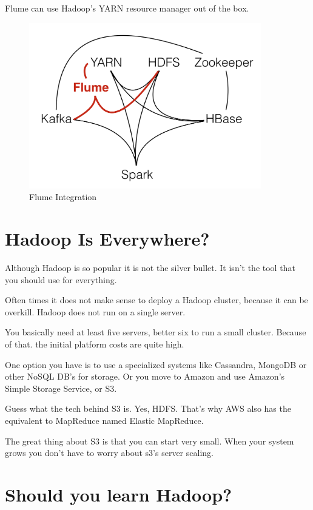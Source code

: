 \documentclass[12pt, numbers=noenddot]{scrreprt} %
\begin{document}
Flume can use Hadoop’s YARN resource manager out of the box.

\begin{figure}[htbp]
  \centering
     \includegraphics[width=0.9\textwidth]{images/Hadoop-Ecosystem-Connections-Flume.png}
  \caption{Flume Integration}
  \label{fig:Bild1}
\end{figure}



\section{Hadoop Is Everywhere?}

Although Hadoop is so popular it is not the silver bullet. It isn’t the tool that you should use for everything.

Often times it does not make sense to deploy a Hadoop cluster, because it can be overkill. Hadoop does not run on a single server.

You basically need at least five servers, better six to run a small cluster. Because of that. the initial platform costs are quite high.

One option you have is to use a specialized systems like Cassandra, MongoDB or other NoSQL DB’s for storage. Or you move to Amazon and use Amazon’s Simple Storage Service, or S3.

Guess what the tech behind S3 is. Yes, HDFS. That’s why AWS also has the equivalent to MapReduce named Elastic MapReduce.

The great thing about S3 is that you can start very small. When your system grows you don’t have to worry about s3’s server scaling.

\section{Should you learn Hadoop? }
\end{document}

